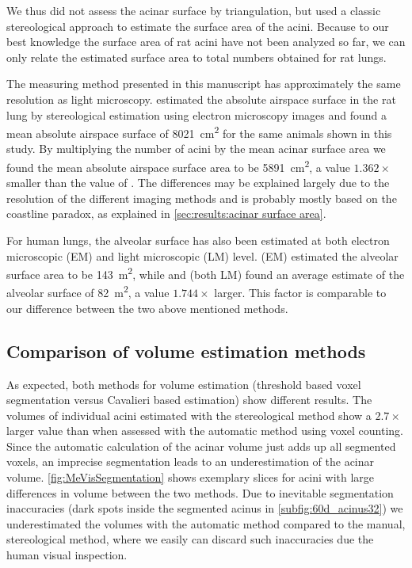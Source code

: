 \documentclass[paper=a4,twocolumn=true,DIV=calc,abstract,english]{scrartcl}
\newcommand{\difference}{2.7\xspace} %
\newcommand{\meanairspacesurface}{5891} %
\newcommand{\airspacedifference}{1.362\xspace} %
\begin{document}
We thus did not assess the acinar surface by triangulation, but used a classic stereological approach to estimate the surface area of the acini.
Because to our best knowledge the surface area of rat acini have not been analyzed so far, we can only relate the estimated surface area to total numbers obtained for rat lungs.

The measuring method presented in this manuscript has approximately the same resolution as light microscopy.
\citet{Tschanz2003} estimated the absolute airspace surface in the rat lung by stereological estimation using electron microscopy images and found a mean absolute airspace surface of \SI{8021}{\centi\meter\squared} for the same animals shown in this study.
By multiplying the number of acini by the mean acinar surface area we found the mean absolute airspace surface area to be \SI{\meanairspacesurface}{\centi\meter\squared}, a value \(\airspacedifference\times\) smaller than the value of \citeauthor{Tschanz2003}.
The differences may be explained largely due to the resolution of the different imaging methods and is probably mostly based on the coastline paradox, as explained in \autoref{sec:results:acinar surface area}.

For human lungs, the alveolar surface has also been estimated at both electron microscopic (EM) and light microscopic (LM) level.
\citet{Gehr1978} (EM) estimated the alveolar surface area to be \SI{143}{\square\meter}, while \citet{Weibel1963} and \citet{Thurlbeck1967} (both LM) found an average estimate of the alveolar surface of \SI{82}{\square\meter}, a value \(1.744\times\) larger.
This factor is comparable to our difference between the two above mentioned methods.

\subsection{Comparison of volume estimation methods}
As expected, both methods for volume estimation (threshold based voxel segmentation versus Cavalieri based estimation) show different results.
The volumes of individual acini estimated with the stereological method show a \(\difference\times\) larger value than when assessed with the automatic method using voxel counting.
Since the automatic calculation of the acinar volume just adds up all segmented voxels, an imprecise segmentation leads to an underestimation of the acinar volume.
\autoref{fig:MeVisSegmentation} shows exemplary slices for acini with large differences in volume between the two methods.
Due to inevitable segmentation inaccuracies (dark spots inside the segmented acinus in \autoref{subfig:60d_acinus32}) we underestimated the volumes with the automatic method compared to the manual, stereological method, where we easily can discard such inaccuracies due the human visual inspection.
\end{document}
